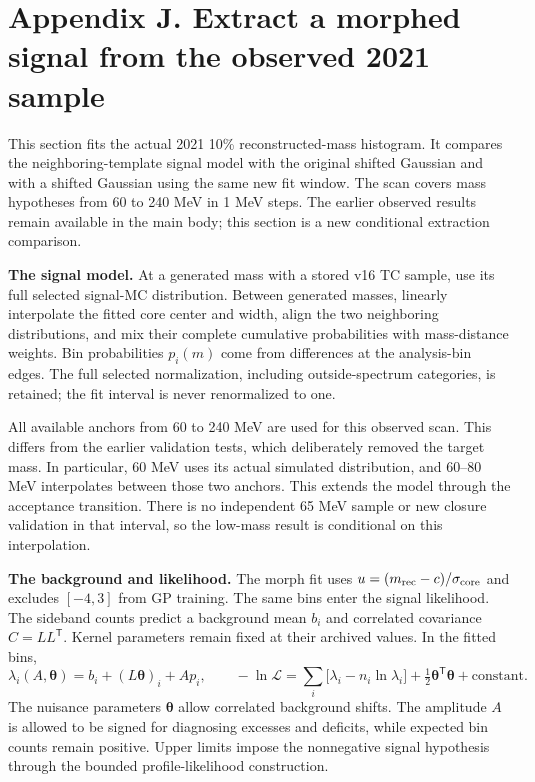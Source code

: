 \documentclass[11pt]{article}
\begin{document}
\section*{Appendix J. Extract a morphed signal from the observed 2021 sample}

This section fits the actual 2021 10\% reconstructed-mass histogram. It compares the neighboring-template signal model with the original shifted Gaussian and with a shifted Gaussian using the same new fit window. The scan covers mass hypotheses from 60 to 240 MeV in 1 MeV steps. The earlier observed results remain available in the main body; this section is a new conditional extraction comparison.

\textbf{The signal model.} At a generated mass with a stored v16 TC sample, use its full selected signal-MC distribution. Between generated masses, linearly interpolate the fitted core center and width, align the two neighboring distributions, and mix their complete cumulative probabilities with mass-distance weights. Bin probabilities $p_i(m)$ come from differences at the analysis-bin edges. The full selected normalization, including outside-spectrum categories, is retained; the fit interval is never renormalized to one.

All available anchors from 60 to 240 MeV are used for this observed scan. This differs from the earlier validation tests, which deliberately removed the target mass. In particular, 60 MeV uses its actual simulated distribution, and 60--80 MeV interpolates between those two anchors. This extends the model through the acceptance transition. There is no independent 65 MeV sample or new closure validation in that interval, so the low-mass result is conditional on this interpolation.

\textbf{The background and likelihood.} The morph fit uses $u=(m_{\rm rec}-c)/\sigma_{\rm core}$ and excludes $[-4,3]$ from GP training. The same bins enter the signal likelihood. The sideband counts predict a background mean $b_i$ and correlated covariance $C=LL^{\mathsf T}$. Kernel parameters remain fixed at their archived values. In the fitted bins,
\[
 \lambda_i(A,\boldsymbol\theta)=b_i+(L\boldsymbol\theta)_i+A p_i,
 \qquad
 -\ln\mathcal L=\sum_i\bigl[\lambda_i-n_i\ln\lambda_i\bigr]
 +\tfrac12\boldsymbol\theta^{\mathsf T}\boldsymbol\theta+\mathrm{constant}.
\]
The nuisance parameters $\boldsymbol\theta$ allow correlated background shifts. The amplitude $A$ is allowed to be signed for diagnosing excesses and deficits, while expected bin counts remain positive. Upper limits impose the nonnegative signal hypothesis through the bounded profile-likelihood construction.
\end{document}
